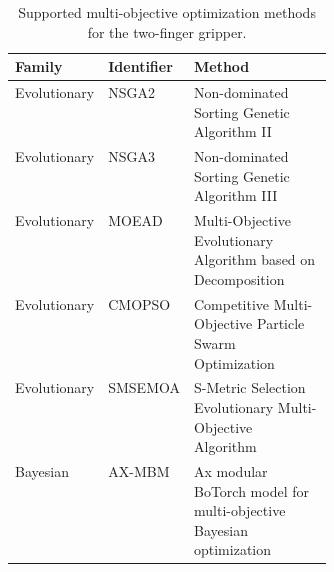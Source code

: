 \begin{table}[H]
\centering
\caption{Supported multi-objective optimization methods for the two-finger gripper.}
\label{tab:two_finger_algorithms}
\small
\begin{tabularx}{\textwidth}{
    @{}
    p{0.20\linewidth}
    p{0.17\linewidth}
    >{\raggedright\arraybackslash}X
    @{}
}
\toprule
\textbf{Family} & \textbf{Identifier} & \textbf{Method} \\
\midrule
Evolutionary & NSGA2   & Non-dominated Sorting Genetic Algorithm II \\
Evolutionary & NSGA3   & Non-dominated Sorting Genetic Algorithm III \\
Evolutionary & MOEAD   & Multi-Objective Evolutionary Algorithm based on Decomposition \\
Evolutionary & CMOPSO  & Competitive Multi-Objective Particle Swarm Optimization \\
Evolutionary & SMSEMOA & S-Metric Selection Evolutionary Multi-Objective Algorithm \\
Bayesian     & AX-MBM  & Ax modular BoTorch model for multi-objective Bayesian optimization \\
\bottomrule
\end{tabularx}
\end{table}


